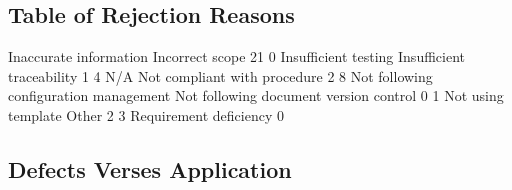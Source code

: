 \documentclass{article}
\begin{document}
\subsection{Table of Rejection Reasons}
\begin{Schunk}
\begin{Soutput}
                Inaccurate information                        Incorrect scope
                                    21                                      0
                  Insufficient testing              Insufficient traceability
                                     1                                      4
                                   N/A           Not compliant with procedure
                                     2                                      8
Not following configuration management Not following document version control
                                     0                                      1
                    Not using template                                  Other
                                     2                                      3
                Requirement deficiency
                                     0
\end{Soutput}
\end{Schunk}

\subsection{Defects Verses Application}
\end{document}
